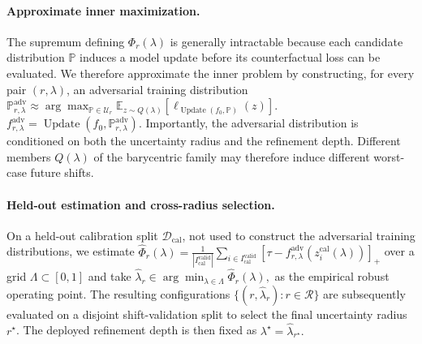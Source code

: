 \paragraph{Approximate inner maximization.}
The supremum defining $\Phi_r(\lambda)$ is generally intractable because
each candidate distribution $\mathbb{P}$ induces a model update before its
counterfactual loss can be evaluated. We therefore approximate the inner
problem by constructing, for every pair $(r,\lambda)$, an adversarial
training distribution
$
\mathbb{P}_{r,\lambda}^{\mathrm{adv}}
\approx
\arg\max_{\mathbb{P}\in\mathcal U_r}
\mathbb E_{z\sim Q(\lambda)}
\left[
\ell_{\operatorname{Update}(f_0,\mathbb{P})}(z)
\right].
$
$
f_{r,\lambda}^{\mathrm{adv}}
=
\operatorname{Update}
\left(
f_0,
\mathbb{P}_{r,\lambda}^{\mathrm{adv}}
\right).
$
Importantly, the adversarial distribution is conditioned on both the
uncertainty radius and the refinement depth. Different members $Q(\lambda)$ of the barycentric family may therefore induce different worst-case future shifts.

\paragraph{Held-out estimation and cross-radius selection.}
On a held-out calibration split $\mathcal D_{\mathrm{cal}}$, not used to construct the adversarial training distributions, we estimate  %
$
\widehat\Phi_r(\lambda)
=
\frac{1}{|I_{\mathrm{cal}}^{\mathrm{valid}}|}
\sum_{i\in I_{\mathrm{cal}}^{\mathrm{valid}}}
\left[
\tau-
f_{r,\lambda}^{\mathrm{adv}}
\left(
z_i^{\mathrm{cal}}(\lambda)
\right)
\right]_+ 
$ over a grid $\Lambda\subset[0,1]$ and take $
\widehat\lambda_r
\in
\arg\min_{\lambda\in\Lambda}
\widehat\Phi_r(\lambda),
$
as the empirical robust operating point. 
The resulting configurations
$
\{(r,\widehat\lambda_r):r\in\mathcal R\}
$
are subsequently evaluated on a disjoint shift-validation split to
select the final uncertainty radius $r^\star$. The deployed refinement
depth is then fixed as
$
\lambda^\star
=
\widehat\lambda_{r^\star}.
$


